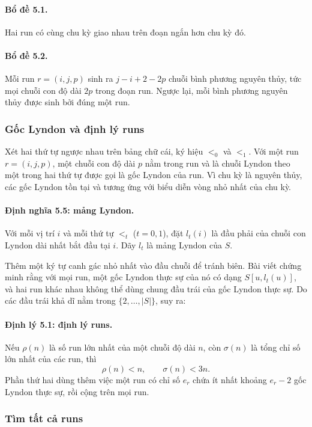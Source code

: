 \documentclass[11pt]{article}
\begin{document}
\paragraph{Bổ đề 5.1.}
Hai run có cùng chu kỳ giao nhau trên đoạn ngắn hơn chu kỳ đó.

\paragraph{Bổ đề 5.2.}
Mỗi run $r=(i,j,p)$ sinh ra $j-i+2-2p$ chuỗi bình phương nguyên thủy, tức mọi
chuỗi con độ dài $2p$ trong đoạn run. Ngược lại, mỗi bình phương nguyên thủy
được sinh bởi đúng một run.

\subsubsection{Gốc Lyndon và định lý runs}

Xét hai thứ tự ngược nhau trên bảng chữ cái, ký hiệu $<_0$ và $<_1$. Với một run
$r=(i,j,p)$, một chuỗi con độ dài $p$ nằm trong run và là chuỗi Lyndon theo một
trong hai thứ tự được gọi là gốc Lyndon của run. Vì chu kỳ là nguyên thủy, các
gốc Lyndon tồn tại và tương ứng với biểu diễn vòng nhỏ nhất của chu kỳ.

\paragraph{Định nghĩa 5.5: mảng Lyndon.}
Với mỗi vị trí $i$ và mỗi thứ tự $<_t$ ($t=0,1$), đặt $l_t(i)$ là đầu phải của
chuỗi con Lyndon dài nhất bắt đầu tại $i$. Dãy $l_t$ là mảng Lyndon của $S$.

Thêm một ký tự canh gác nhỏ nhất vào đầu chuỗi để tránh biên. Bài viết chứng
minh rằng với mọi run, một gốc Lyndon thực sự của nó có dạng
$S[u,l_t(u)]$, và hai run khác nhau không thể dùng chung đầu trái của gốc Lyndon
thực sự. Do các đầu trái khả dĩ nằm trong $\{2,\ldots,|S|\}$, suy ra:

\paragraph{Định lý 5.1: định lý runs.}
Nếu $\rho(n)$ là số run lớn nhất của một chuỗi độ dài $n$, còn $\sigma(n)$ là
tổng chỉ số lớn nhất của các run, thì
\[
  \rho(n)<n,\qquad \sigma(n)<3n.
\]
Phần thứ hai dùng thêm việc một run có chỉ số $e_r$ chứa ít nhất khoảng
$e_r-2$ gốc Lyndon thực sự, rồi cộng trên mọi run.

\subsubsection{Tìm tất cả runs}
\end{document}
